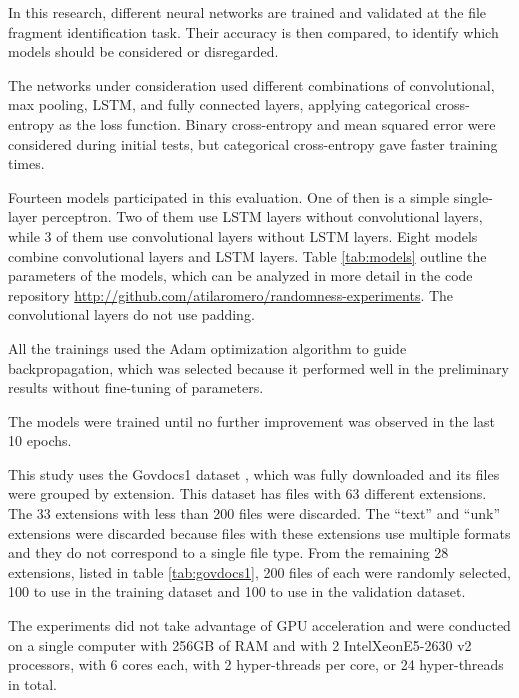 In this research, different neural networks are trained and validated
at the file fragment identification task. Their accuracy is then compared,
to identify which models should be considered or disregarded.

The networks under consideration used different combinations of convolutional, max pooling, LSTM, and fully connected layers,
applying categorical cross-entropy as the loss function. Binary cross-entropy and mean squared error were considered during initial tests, but categorical cross-entropy gave faster training times.

Fourteen models participated in this evaluation. One of then is a simple single-layer perceptron. Two of them use LSTM layers without convolutional layers, while 3 of them use convolutional layers without LSTM layers. Eight models combine convolutional layers and LSTM layers. Table \ref{tab:models} outline the parameters of the models, which can be analyzed in more detail in the code repository \sloppy\url{http://github.com/atilaromero/randomness-experiments}. The convolutional layers do not use padding. 



All the trainings used the Adam \cite{kingma_adam:_2014}
optimization algorithm to guide backpropagation, which was selected because it performed well in the preliminary results without fine-tuning of parameters.

The models were trained until no further improvement was observed in the last 10 epochs.


This study uses the Govdocs1 dataset \cite{garfinkel_bringing_2009}, which was fully downloaded and its files were grouped by extension. This dataset has files with 63 different extensions. The 33 extensions with less than 200 files were discarded. The  ``text'' and ``unk'' extensions were discarded because files with these extensions use multiple formats and they do not correspond to a single file type. From the remaining 28 extensions, listed in table \ref{tab:govdocs1}, 200 files of each were randomly selected, 100 to use in the training dataset and 100 to use in the validation dataset.



The experiments did not take advantage of GPU acceleration and were  conducted on a single computer with 256GB of RAM and with 2 Intel\textregistered Xeon\textregistered E5-2630 v2 processors, with 6 cores each, with 2 hyper-threads per core, or 24 hyper-threads in total. 


